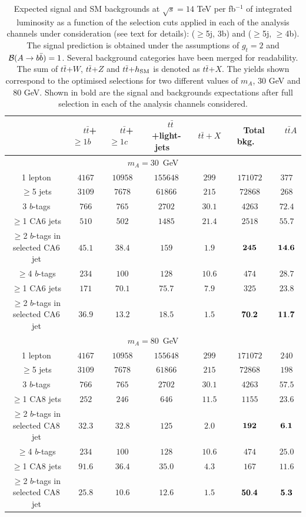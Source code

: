 \documentclass[preprintnumbers,superscriptaddress,nofootinbib,aps,prd,floatfix]{revtex4}
\newcommand{\ttbar}{\ensuremath{t\bar{t}}}
\begin{document}
\begin{table}[h] 
\begin{center} 
\begin{tabular}{ccccc|cc} 
\hline\hline
&$\quad$$\ttbar$+$\geq$$1b$$\quad$ &$\quad$$\ttbar$+$\geq$$1c$$\quad$&$\quad$$\ttbar$+light-jets$\quad$&$\quad$$\ttbar+X$$\quad$ & $\quad$Total bkg.$\quad$ & $\quad$$\ttbar A$$\quad$ \\ 
\hline\hline
\multicolumn{7}{c}{$m_A=30$~GeV} \\
\hline
1 lepton&$4167$&$10958$&$155648$&$299$&$171072$&$377$ \\ 
$\geq$5 jets&$3109$&$7678$&$61866$&$215$&$72868$&$268$ \\ 
\hline
3 $b$-tags&$766$&$765$&$2702$&$30.1$&$4263$&$72.4$ \\ 
$\geq$1 CA6 jets &$510$&$502$&$1485$&$21.4$&$2518$&$55.7$ \\ 
$\geq$2 $b$-tags in selected CA6 jet & $45.1$&$38.4$&$159$&$1.9$&$\bf 245$&$\bf 14.6$ \\ 
\hline
$\geq$4 $b$-tags&$234$&$100$&$128$&$10.6$&$474$&$28.7$ \\ 
$\geq$1 CA6 jets&$171$&$70.1$&$75.7$&$7.9$&$325$&$23.8$ \\ 
$\geq$2 $b$-tags in selected CA6 jet &$36.9$&$13.2$&$18.5$&$1.5$&$\bf 70.2$&$\bf 11.7$ \\ 
\hline\hline
\multicolumn{7}{c}{$m_A=80$~GeV} \\
\hline
1 lepton&$4167$&$10958$&$155648$&$299$&$171072$&$240$ \\ 
$\geq$5 jets&$3109$&$7678$&$61866$&$215$&$72868$&$198$ \\ 
\hline
3 $b$-tags&$766$&$765$&$2702$&$30.1$&$4263$&$57.5$ \\ 
$\geq$1 CA8 jets &$252$&$246$&$646$&$11.5$&$1155$&$23.6$ \\ 
$\geq$2 $b$-tags in selected CA8 jet &$32.3$&$32.8$&$125$&$2.0$&$\bf 192$&$\bf 6.1$ \\ 
\hline
$\geq$4 $b$-tags&$234$&$100$&$128$&$10.6$&$474$&$25.0$ \\ 
$\geq$1 CA8 jets&$91.6$&$36.4$&$35.0$&$4.3$&$167$&$11.6$ \\ 
$\geq$2 $b$-tags in selected CA8 jet &$25.8$&$10.6$&$12.6$&$1.5$&$\bf 50.4$&$\bf 5.3$ \\ 
\hline\hline
\end{tabular} 
\caption{\small {Expected signal and SM backgrounds at $\sqrt{s}=14$ TeV
per fb$^{-1}$ of integrated luminosity as a function of the selection cuts applied in each
of the analysis channels under consideration (see text for details): ($\geq$5j, 3b) and ($\geq$5j, $\geq$4b).
The signal prediction is obtained under the assumptions of $g_t=2$ and ${\cal B}(A\to b\bar{b})=1$.
Several background categories have been merged for readability. The sum of 
$\ttbar$+$W$, $\ttbar$+$Z$ and $\ttbar$+$h_{\rm SM}$ is denoted as $\ttbar$+$X$. 
The yields shown correspond to the optimised selections for two different values
of $m_A$, 30 GeV and 80 GeV. Shown in bold are the signal and backgrounds
expectations after full selection in each of the analysis channels considered.}}
\label{tab:yields} 
\end{center} 
\end{table} 
\end{document}
